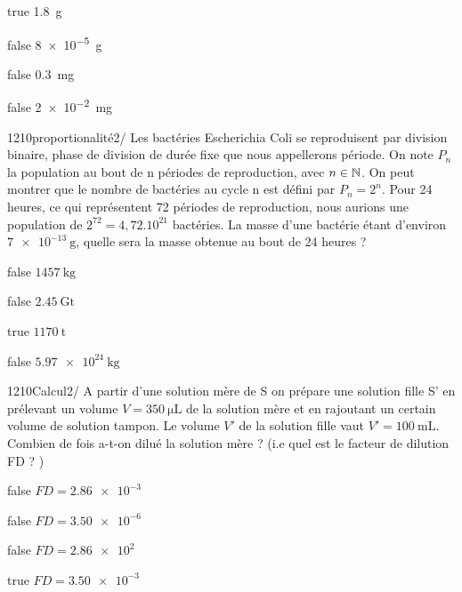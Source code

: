             \begin{reponses}
            	\item[true]  \SI{1.8}{\gram}
            	\item[false]  \SI{8e-5}{\gram}
                \item[false]  \SI{0.3}{\milli\gram}
                \item[false]   \SI{2e-2}{\milli\gram}
            \end{reponses}
			\begin{question}{1210}{proportionalité}{2}{/}
		        Les bactéries Escherichia Coli se reproduisent par division binaire, phase de division de durée fixe que nous appellerons période. On note $P_n$ la population au bout de n périodes de reproduction, avec $n \in \mathbb {N}  $. On peut montrer que le nombre de bactéries au cycle n est défini par $P_n = 2^n$. Pour 24 heures, ce qui représentent 72 périodes de reproduction, nous aurions une population de $2^{72} = 4,72.10^{21}$ bactéries. La masse d’une bactérie étant d’environ $\SI{7e-13}{\gram}$, quelle sera la masse obtenue au bout de 24 heures ? 
            \end{question}
            \begin{reponses}
            	\item[false]  $ \SI{1457}{\kilo\gram} $
            	\item[false]  $ \SI{2.45}{\giga\tonne} $
                \item[true]  $ \SI{1170}{\tonne} $
                \item[false]   $ \SI{5,97e24}{\kilo\gram} $
            \end{reponses}
			\begin{question}{1210}{Calcul}{2}{/}
				 A partir d’une solution mère de S on prépare une solution fille S' en prélevant un volume $V = \SI{350}{\micro\liter}$ de la solution mère et en rajoutant un certain volume de solution tampon. Le volume $V'$ de la solution fille vaut $V' = \SI{100}{\milli\liter}$. Combien de fois a-t-on dilué la solution mère ? (i.e quel est le facteur de dilution FD ? ) 
            \end{question}
            \begin{reponses}
            	\item[false]  $FD = \SI{2.86e-3}{} $
            	\item[false]  $FD = \SI{3.50e-6}{}$
                \item[false]  $FD = \SI{2.86e2}{}$
                \item[true]   $FD = \SI{3.50e-3}{}$
            \end{reponses}
